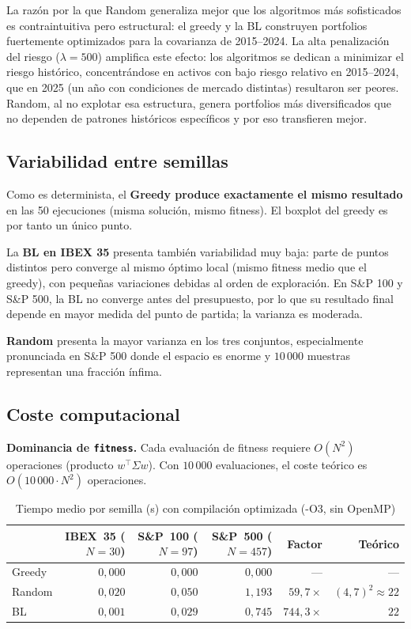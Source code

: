 \documentclass[12pt,a4paper]{article}
\begin{document}
La razón por la que Random generaliza mejor que los algoritmos más
sofisticados es contraintuitiva pero estructural: el greedy y la BL
construyen portfolios fuertemente optimizados para la covarianza de 2015--2024.
La alta penalización del riesgo ($\lambda = 500$) amplifica este efecto: los algoritmos
se dedican a minimizar el riesgo histórico, concentrándose en activos con bajo riesgo
relativo en 2015--2024, que en 2025 (un año con condiciones de mercado distintas)
resultaron ser peores. Random, al no explotar esa estructura, genera portfolios más
diversificados que no dependen de patrones históricos específicos y por eso transfieren mejor.

\subsection{Variabilidad entre semillas}

Como es determinista, el \textbf{Greedy produce exactamente el mismo resultado}
en las 50 ejecuciones (misma solución, mismo fitness).
El boxplot del greedy es por tanto un único punto.

La \textbf{BL en IBEX 35} presenta también variabilidad muy baja:
parte de puntos distintos pero converge al mismo óptimo local
(mismo fitness medio que el greedy), con pequeñas variaciones debidas al orden
de exploración.
En S\&P 100 y S\&P 500, la BL no converge antes del presupuesto,
por lo que su resultado final depende en mayor medida del punto de partida;
la varianza es moderada.

\textbf{Random} presenta la mayor varianza en los tres conjuntos,
especialmente pronunciada en S\&P 500 donde el espacio es enorme y
$10\,000$ muestras representan una fracción ínfima.

\subsection{Coste computacional}

\textbf{Dominancia de \texttt{fitness}.}
Cada evaluación de fitness requiere $O(N^2)$ operaciones (producto $w^\top\Sigma w$).
Con $10\,000$ evaluaciones, el coste teórico es $O(10\,000 \cdot N^2)$ operaciones.

\begin{table}[H]
\centering
\footnotesize
\caption{Tiempo medio por semilla (s) con compilación optimizada (-O3, sin OpenMP)}
\label{tab:tiempos}
\begin{tabular}{lrrrrr}
\toprule
 & \textbf{IBEX~35} ($N=30$)
 & \textbf{S\&P~100} ($N=97$)
 & \textbf{S\&P~500} ($N=457$)
 & \textbf{Factor} & \textbf{Teórico} \\
\midrule
Greedy & $0{,}000$ & $0{,}000$ & $0{,}000$ & --- & --- \\
Random & $0{,}020$   & $0{,}050$   & $1{,}193$  & $59{,}7\times$ & $(4{,}7)^2 \approx 22$ \\
BL     & $0{,}001$   & $0{,}029$   & $0{,}745$  & $744{,}3\times$ & $22$ \\
\bottomrule
\end{tabular}
\end{table}
\end{document}

